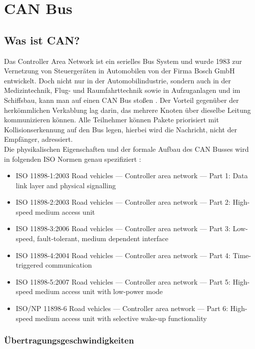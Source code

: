 \section{CAN Bus}

\subsection{Was ist CAN?}
	
Das Controller Area Network ist ein serielles Bus System und wurde
1983 zur Vernetzung von Steuergeräten in Automobilen von der Firma
Bosch GmbH entwickelt. Doch nicht nur in der Automobilindustrie,
sondern auch in der Medizintechnik, Flug- und Raumfahrttechnik sowie
in Aufzuganlagen und im Schiffsbau, kann man auf einen CAN Bus stoßen
\citep[nach][]{WI1}. Der Vorteil gegenüber der herkömmlichen Verkablung
lag darin, das mehrere Knoten über dieselbe Leitung kommunizieren
können. Alle Teilnehmer können Pakete priorisiert mit
Kollisionserkennung auf den Bus legen, hierbei wird die Nachricht,
nicht der Empfänger, adressiert.
\\
Die physikalischen Eigenschaften und der formale Aufbau des CAN Busses
wird in folgenden ISO Normen genau spezifiziert \citep[nach][]{WI1}:

\begin{itemize}
\item ISO 11898-1:2003 Road vehicles — Controller area network — 
Part 1: Data link layer and physical signalling
\item ISO 11898-2:2003 Road vehicles — Controller area network — 
Part 2: High-speed medium access unit
\item ISO 11898-3:2006 Road vehicles — Controller area network — 
Part 3: Low-speed, fault-tolerant, medium dependent interface
\item ISO 11898-4:2004 Road vehicles — Controller area network — 
Part 4: Time-triggered communication
\item ISO 11898-5:2007 Road vehicles — Controller area network — 
Part 5: High-speed medium access unit with low-power mode
\item ISO/NP 11898-6 Road vehicles — Controller area network — 
Part 6: High-speed medium access unit with selective wake-up functionality
\end{itemize}

\subsubsection{Übertragungsgeschwindigkeiten}

